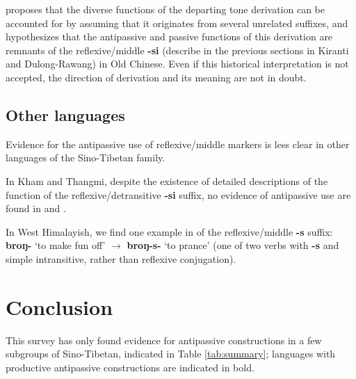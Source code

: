 \documentclass[oneside,a4paper,11pt]{article}
\newcommand{\ipa}[1]{{\phon\textbf{#1}}}
\begin{document}
 \citet{jacques16ssuffixes} proposes that the diverse functions of the departing tone derivation can be accounted for by assuming that it originates from several unrelated suffixes, and hypothesizes that the antipassive and passive functions of this derivation are remnants of the reflexive/middle \ipa{-si} (describe in the previous sections in Kiranti and Dulong-Rawang) in Old Chinese. Even if this historical interpretation is not accepted, the direction of derivation and its meaning are not in doubt.

  \subsection{Other languages} \label{sec:other.refl}
Evidence for the antipassive use of reflexive/middle markers is less clear in other languages of the Sino-Tibetan family.
  
 In Kham and Thangmi, despite the existence of detailed descriptions of the function of the reflexive/detransitive \ipa{-si} suffix, no evidence of antipassive use are found in \citet[105;240-7]{watters02grammar} and \citet[372-6]{turin12thangmi}.
 
 In West Himalayish, we find one example in \citet[452;466]{widmer14bunan} of the reflexive/middle \ipa{-s} suffix: \ipa{broŋ-} `to make fun off' $\rightarrow$ \ipa{broŋ-s-} `to prance' (one of two verbs with \ipa{-s} and simple intransitive, rather than reflexive conjugation).
 

\section{Conclusion}
This survey has only found evidence for antipassive constructions in a few subgroups of Sino-Tibetan, indicated in Table \ref{tab:summary}; languages with productive antipassive constructions are indicated in bold.
\end{document}
